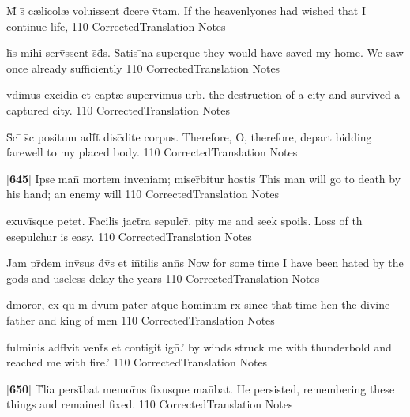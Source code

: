\latline
  {M\={} s\={\macron {\i}} c{\ae}licol{\ae} voluissent d\={}cere v\={\macron {\i}}tam,}
  { If the heavenlyones had wished that I continue life, }
  {110}
  { CorrectedTranslation }
  { Notes }


\latline
  {h\={}s mihi serv\={}ssent s\={}d\={}s.  Satis \={}na superque}
  { they would have saved my home.  We saw once already sufficiently }
  {110}
  { CorrectedTranslation }
  { Notes }


\latline
  {v\={\macron {\i}}dimus excidia et capt{\ae} super\={}vimus urb\={\macron {\i}}.}
  { the destruction of a city and survived a captured city. }
  {110}
  { CorrectedTranslation }
  { Notes }


\latline
  {S\={\macron {\i}}c \={} s\={\macron {\i}}c positum adf\={}t\={\macron {\i}} disc\={}dite corpus.}
  { Therefore, O, therefore, depart bidding farewell to my placed body. }
  {110}
  { CorrectedTranslation }
  { Notes }


\latline
  {[\textbf{645}] Ipse man\={} mortem inveniam; miser\={}bitur hostis}
  { This man will go to death by his hand; an enemy will }
  {110}
  { CorrectedTranslation }
  { Notes }


\latline
  {exuvi\={}sque petet.  Facilis jact\={}ra sepulcr\={\macron {\i}}.}
  { pity me and seek spoils.  Loss of th esepulchur is easy. }
  {110}
  { CorrectedTranslation }
  { Notes }


\latline
  {Jam pr\={\macron {\i}}dem inv\={\macron {\i}}sus d\={\macron {\i}}v\={\macron {\i}}s et in\={}tilis ann\={}s}
  { Now for some time I have been hated by the gods and useless delay the years }
  {110}
  { CorrectedTranslation }
  { Notes }


\latline
  {d\={}moror, ex qu\={} m\={} d\={\macron {\i}}vum pater atque hominum r\={}x}
  { since that time hen the divine father and king of men  }
  {110}
  { CorrectedTranslation }
  { Notes }


\latline
  {fulminis adfl\={}vit vent\={\macron {\i}}s et contigit ign\={\macron {\i}}.'}
  { by winds struck me with thunderbold and reached me with fire.' }
  {110}
  { CorrectedTranslation }
  { Notes }

\latline
  {[\textbf{650}]  T\={}lia perst\={}bat memor\={}ns fixusque man\={}bat.}
  { He persisted, remembering these things and remained fixed. }
  {110}
  { CorrectedTranslation }
  { Notes }





